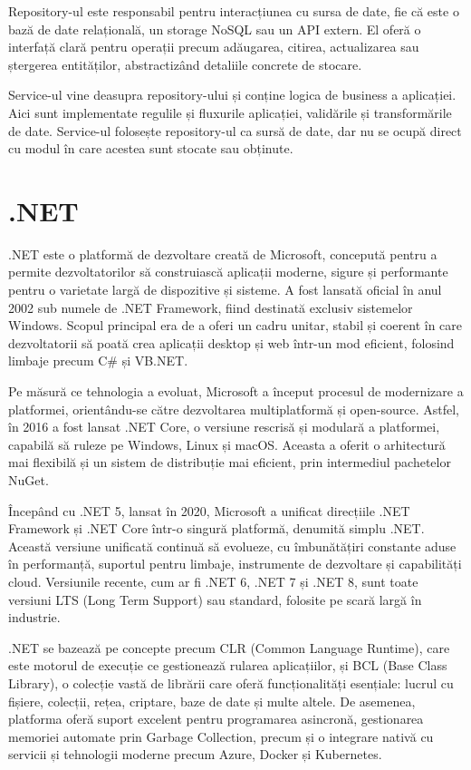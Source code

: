 Repository-ul este responsabil pentru interacțiunea cu sursa de date, fie că este o bază de date relațională, un storage NoSQL sau un API extern. El oferă o interfață clară pentru operații precum adăugarea, citirea, actualizarea sau ștergerea entităților, abstractizând detaliile concrete de stocare. \parencite{designPatterns}

Service-ul vine deasupra repository-ului și conține logica de business a aplicației. Aici sunt implementate regulile și fluxurile aplicației, validările și transformările de date. Service-ul folosește repository-ul ca sursă de date, dar nu se ocupă direct cu modul în care acestea sunt stocate sau obținute. \parencite{designPatterns}

\section{.NET}

.NET este o platformă de dezvoltare creată de Microsoft, concepută pentru a permite dezvoltatorilor să construiască aplicații moderne, sigure și performante pentru o varietate largă de dispozitive și sisteme. A fost lansată oficial în anul 2002 sub numele de .NET Framework, fiind destinată exclusiv sistemelor Windows. Scopul principal era de a oferi un cadru unitar, stabil și coerent în care dezvoltatorii să poată crea aplicații desktop și web într-un mod eficient, folosind limbaje precum C\# și VB.NET. \parencite{dotnet}

Pe măsură ce tehnologia a evoluat, Microsoft a început procesul de modernizare a platformei, orientându-se către dezvoltarea multiplatformă și open-source. Astfel, în 2016 a fost lansat .NET Core, o versiune rescrisă și modulară a platformei, capabilă să ruleze pe Windows, Linux și macOS. Aceasta a oferit o arhitectură mai flexibilă și un sistem de distribuție mai eficient, prin intermediul pachetelor NuGet. \parencite{dotnet}

Începând cu .NET 5, lansat în 2020, Microsoft a unificat direcțiile .NET Framework și .NET Core într-o singură platformă, denumită simplu .NET. Această versiune unificată continuă să evolueze, cu îmbunătățiri constante aduse în performanță, suportul pentru limbaje, instrumente de dezvoltare și capabilități cloud. Versiunile recente, cum ar fi .NET 6, .NET 7 și .NET 8, sunt toate versiuni LTS (Long Term Support) sau standard, folosite pe scară largă în industrie. \parencite{dotnet}

.NET se bazează pe concepte precum CLR (Common Language Runtime), care este motorul de execuție ce gestionează rularea aplicațiilor, și BCL (Base Class Library), o colecție vastă de librării care oferă funcționalități esențiale: lucrul cu fișiere, colecții, rețea, criptare, baze de date și multe altele. De asemenea, platforma oferă suport excelent pentru programarea asincronă, gestionarea memoriei automate prin Garbage Collection, precum și o integrare nativă cu servicii și tehnologii moderne precum Azure, Docker și Kubernetes. \parencite{dotnet}

